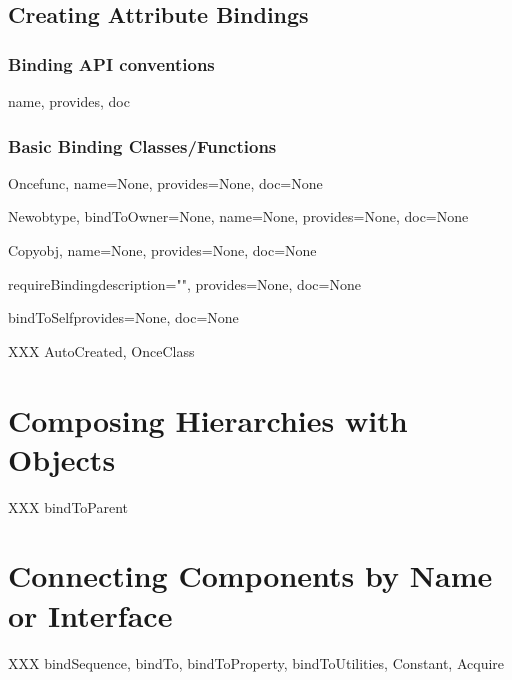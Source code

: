 \subsection{Creating Attribute Bindings}

\subsubsection{Binding API conventions}

name, provides, doc

\subsubsection{Basic Binding Classes/Functions}

\begin{classdesc}{Once}{func, name=None, provides=None, doc=None}
\end{classdesc}

\begin{funcdesc}{New}{obtype, bindToOwner=None, name=None, provides=None,
doc=None}
\end{funcdesc}

\begin{funcdesc}{Copy}{obj, name=None, provides=None, doc=None}
\end{funcdesc}

\begin{classdesc}{requireBinding}{description="", provides=None, doc=None}
\end{classdesc}

\begin{funcdesc}{bindToSelf}{provides=None, doc=None}
\end{funcdesc}

XXX AutoCreated, OnceClass


\section{Composing Hierarchies with  Objects}

XXX bindToParent


\section{Connecting Components by Name or Interface}

XXX bindSequence, bindTo, bindToProperty, bindToUtilities, Constant, Acquire

